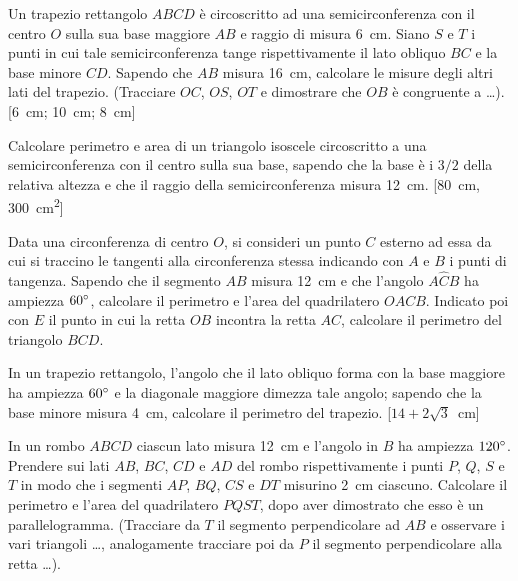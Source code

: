 \begin{multicols}{2}
\begin{esercizio}
\label{ese:7.85}
Un trapezio rettangolo $ABCD$ è circoscritto ad una semicirconferenza con il centro $O$ sulla sua base maggiore $AB$ e raggio di misura 6~cm. Siano $S$ e $T$ i punti in cui tale semicirconferenza tange rispettivamente il lato obliquo $BC$ e la base minore $CD$. Sapendo che $AB$ misura 16~cm, calcolare le misure degli altri lati del trapezio. (Tracciare $OC$, $OS$, $OT$ e dimostrare che $OB$ è congruente a \ldots{}).
[6~cm; 10~cm; 8~cm]
\end{esercizio}

\begin{esercizio}
\label{ese:7.86}
Calcolare perimetro e area di un triangolo isoscele circoscritto a una semicirconferenza con il centro sulla sua base, sapendo che la base è i $3/2$ della relativa altezza e che il raggio della semicirconferenza misura 12~cm.
[80~cm, 300~cm\textsuperscript{2}]
\end{esercizio}

\begin{esercizio}
\label{ese:7.87}
Data una circonferenza di centro $O$, si consideri un punto $C$ esterno ad essa da cui si traccino le tangenti alla circonferenza stessa indicando con $A$ e $B$ i punti di tangenza. Sapendo che il segmento $AB$ misura 12~cm e che l'angolo $A\widehat{C}B$ ha ampiezza $60{}^{\circ}$, calcolare il perimetro e l'area del quadrilatero $OACB$. Indicato poi con $E$ il punto in cui la retta $OB$ incontra la retta $AC$, calcolare il perimetro del triangolo $BCD$.
\end{esercizio}

\begin{esercizio}
\label{ese:7.88}
In un trapezio rettangolo, l'angolo che il lato obliquo forma con la base maggiore ha ampiezza $60{}^{\circ}$ e la diagonale maggiore dimezza tale angolo; sapendo che la base minore misura 4~cm,  calcolare il perimetro del trapezio.
[$14 + 2\sqrt{3}$~cm]
\end{esercizio}

\begin{esercizio}
\label{ese:7.89}
In un rombo $ABCD$ ciascun lato misura 12~cm e l'angolo in $B$ ha ampiezza $120{}^{\circ}$. Prendere sui lati $AB$, $BC$, $CD$ e $AD$ del rombo rispettivamente i punti $P$, $Q$, $S$ e $T$ in modo che i segmenti $AP$, $BQ$, $CS$ e $DT$ misurino 2~cm ciascuno. Calcolare il perimetro e l'area del quadrilatero $PQST$, dopo aver dimostrato che esso è un parallelogramma. (Tracciare da $T$ il segmento perpendicolare ad $AB$ e osservare i vari triangoli \ldots{}, analogamente tracciare poi da $P$ il segmento perpendicolare alla retta \ldots{}).  
\end{esercizio}


\end{multicols}
